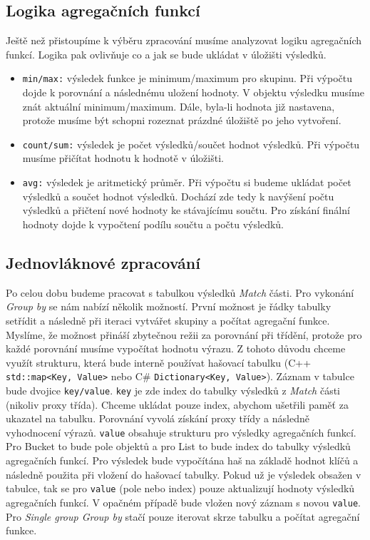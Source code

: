 \subsection{Logika agregačních funkcí}

Ještě než přistoupíme k výběru zpracování musíme analyzovat logiku agregačních funkcí.
Logika pak ovlivňuje co a jak se bude ukládat v úložišti výsledků.

\begin{itemize}
\item \texttt{min/max:} výsledek funkce je minimum/maximum pro skupinu. 
Při výpočtu dojde k porovnání a následnému uložení hodnoty.
V objektu výsledku musíme znát aktuální minimum/maximum.
Dále, byla-li hodnota již nastavena, protože musíme být schopni rozeznat prázdné úložiště po jeho vytvoření.


\item \texttt{count/sum:} výsledek je počet výsledků/součet hodnot výsledků. 
Při výpočtu musíme přičítat hodnotu k hodnotě v úložišti.

\item \texttt{avg:} výsledek je aritmetický průměr.
Při výpočtu si budeme ukládat počet výsledků a součet hodnot výsledků.
Dochází zde tedy k navýšení počtu výsledků a přičtení nové hodnoty ke stávajícímu součtu.
Pro získání finální hodnoty dojde k vypočtení podílu součtu a počtu výsledků.
\end{itemize}

\subsection{Jednovláknové zpracování} \label{anal.groupby.singlethread}

Po celou dobu budeme pracovat s tabulkou výsledků \textit{Match} části.
Pro vykonání \textit{Group by} se nám nabízí několik možností.
První možnost je řádky tabulky setřídit a následně při iteraci vytvářet skupiny a počítat agregační funkce.
Myslíme, že možnost přináší zbytečnou režii za porovnání při třídění, protože pro každé porovnání musíme vypočítat hodnotu výrazu.
Z tohoto důvodu chceme využít strukturu, která bude interně používat hašovací tabulku (C++ \texttt{std::map<Key, Value>} nebo C\#  \texttt{Dictionary<Key, Value>}).
Záznam v tabulce bude dvojice \texttt{key/value}. 
\texttt{key} je zde index do tabulky výsledků z \textit{Match} části (nikoliv proxy třída).
Chceme ukládat pouze index, abychom ušetřili paměť za ukazatel na tabulku.
Porovnání vyvolá získání proxy třídy a následně vyhodnocení výrazů.
\texttt{value} obsahuje strukturu pro výsledky agregačních funkcí.
Pro Bucket to bude pole objektů a pro List to bude index do tabulky výsledků agregačních funkcí.
Pro výsledek bude vypočítána haš na základě hodnot klíčů a následně použita při vložení do hašovací tabulky.
Pokud už je výsledek obsažen v tabulce, tak se pro \texttt{value} (pole nebo index) pouze aktualizují hodnoty výsledků agregačních funkcí.
V opačném případě bude vložen nový záznam s novou \texttt{value}.
Pro \textit{Single group Group by} stačí pouze iterovat skrze tabulku a počítat agregační funkce.

